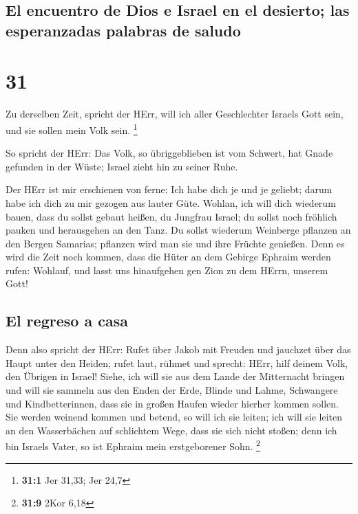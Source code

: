 \hypertarget{el-encuentro-de-dios-e-israel-en-el-desierto-las-esperanzadas-palabras-de-saludo}{%
\subsection{El encuentro de Dios e Israel en el desierto; las
esperanzadas palabras de
saludo}\label{el-encuentro-de-dios-e-israel-en-el-desierto-las-esperanzadas-palabras-de-saludo}}

\hypertarget{section-30}{%
\section{31}\label{section-30}}

 Zu derselben Zeit, spricht der HErr, will ich aller
Geschlechter Israels Gott sein, und sie sollen mein Volk sein.
\footnote{\textbf{31:1} Jer 31,33; Jer 24,7}

 So spricht der HErr: Das Volk, so übriggeblieben ist vom
Schwert, hat Gnade gefunden in der Wüste; Israel zieht hin zu seiner
Ruhe.

 Der HErr ist mir erschienen von ferne: Ich habe dich je
und je geliebt; darum habe ich dich zu mir gezogen aus lauter Güte.
 Wohlan, ich will dich wiederum bauen, dass du sollst
gebaut heißen, du Jungfrau Israel; du sollst noch fröhlich pauken und
herausgehen an den Tanz.  Du sollst wiederum Weinberge
pflanzen an den Bergen Samarias; pflanzen wird man sie und ihre Früchte
genießen.  Denn es wird die Zeit noch kommen, dass die
Hüter an dem Gebirge Ephraim werden rufen: Wohlauf, und lasst uns
hinaufgehen gen Zion zu dem HErrn, unserem Gott!

\hypertarget{el-regreso-a-casa}{%
\subsection{El regreso a casa}\label{el-regreso-a-casa}}

 Denn also spricht der HErr: Rufet über Jakob mit Freuden
und jauchzet über das Haupt unter den Heiden; rufet laut, rühmet und
sprecht: HErr, hilf deinem Volk, den Übrigen in Israel! 
Siehe, ich will sie aus dem Lande der Mitternacht bringen und will sie
sammeln aus den Enden der Erde, Blinde und Lahme, Schwangere und
Kindbetterinnen, dass sie in großen Haufen wieder hierher kommen sollen.
 Sie werden weinend kommen und betend, so will ich sie
leiten; ich will sie leiten an den Wasserbächen auf schlichtem Wege,
dass sie sich nicht stoßen; denn ich bin Israels Vater, so ist Ephraim
mein erstgeborener Sohn. \footnote{\textbf{31:9} 2Kor 6,18}

